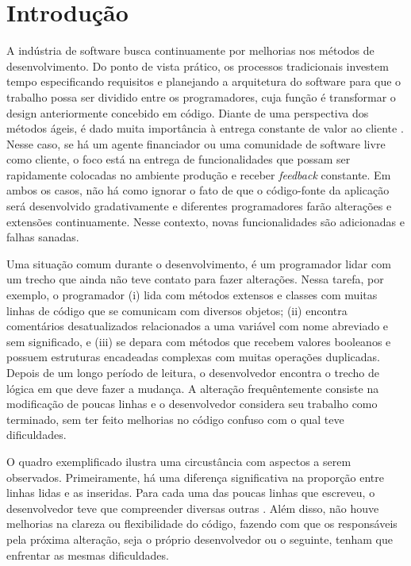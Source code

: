 \chapter{Introdução}
\label{chap:introducao}

A indústria de software busca continuamente por melhorias nos métodos
de desenvolvimento. Do ponto de vista prático, os processos tradicionais investem tempo especificando requisitos
e planejando a arquitetura do software para que o trabalho possa ser dividido entre os
programadores, cuja função é transformar o design anteriormente concebido em código.
%
Diante de uma perspectiva dos métodos ágeis, é dado muita importância à entrega constante 
de valor ao cliente \citep{AgM2001}. Nesse caso, se há um agente financiador ou uma comunidade de software livre
como cliente, o foco está na entrega de funcionalidades que possam ser rapidamente colocadas
no ambiente produção e receber \textit{feedback} constante.
%
Em ambos os casos, não há como ignorar o fato de que o código-fonte da aplicação será
desenvolvido gradativamente e diferentes programadores farão alterações e extensões
continuamente. Nesse contexto, novas funcionalidades são adicionadas e falhas sanadas.

Uma situação comum durante o desenvolvimento, é um programador lidar com um trecho que
ainda não teve contato para fazer alterações. Nessa tarefa, por exemplo, o programador (i) lida com métodos extensos e classes
com muitas linhas de código que se comunicam com diversos objetos; (ii) encontra comentários
desatualizados relacionados a uma variável com nome abreviado e sem significado, e (iii) se depara com métodos que
recebem valores booleanos e possuem estruturas encadeadas complexas com muitas operações duplicadas.
%
Depois de um longo período de leitura, o desenvolvedor encontra o trecho de lógica em que deve 
fazer a mudança. A alteração frequêntemente consiste na modificação de poucas linhas e o 
desenvolvedor considera seu trabalho como terminado, sem ter feito melhorias no código confuso
com o qual teve dificuldades.

O quadro exemplificado ilustra uma circustância com aspectos a serem observados.
Primeiramente, há uma diferença significativa na proporção entre linhas lidas e as inseridas.
Para cada uma das poucas linhas que escreveu, o desenvolvedor teve que compreender diversas
outras \citep{Beck2007}. Além disso, não houve melhorias na clareza ou flexibilidade do código, fazendo 
com que os responsáveis pela próxima alteração, seja o próprio desenvolvedor ou o seguinte,
tenham que enfrentar as mesmas dificuldades.

